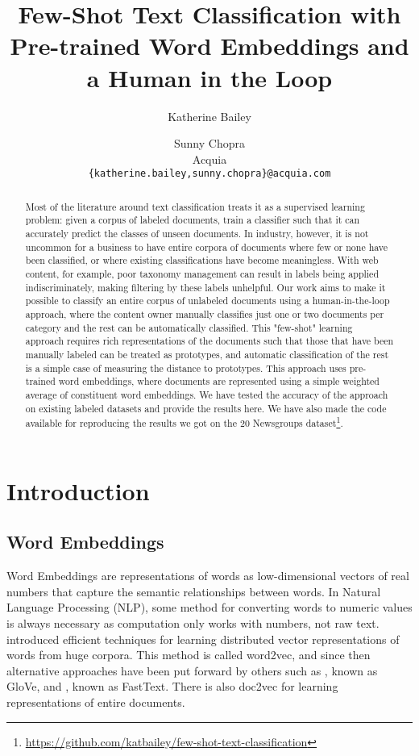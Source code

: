\documentclass{article} %
\title{Few-Shot Text Classification with Pre-trained Word Embeddings and a Human in the Loop}
\author{Katherine Bailey \and Sunny Chopra \\
  Acquia \\
  \texttt{\{katherine.bailey,sunny.chopra\}@acquia.com}
}
\date{}
\begin{document}
\maketitle

\begin{abstract}
Most of the literature around text classification treats it as a supervised learning problem: given a corpus of labeled documents, train a classifier such that it can accurately predict the classes of unseen documents. In industry, however, it is not uncommon for a business to have entire corpora of documents where few or none have been classified, or where existing classifications have become meaningless. With web content, for example, poor taxonomy management can result in labels being applied indiscriminately, making filtering by these labels unhelpful. Our work aims to make it possible to classify an entire corpus of unlabeled documents using a human-in-the-loop approach, where the content owner manually classifies just one or two documents per category and the rest can be automatically classified. This "few-shot" learning approach requires rich representations of the documents such that those that have been manually labeled can be treated as prototypes, and automatic classification of the rest is a simple case of measuring the distance to prototypes. This approach uses pre-trained word embeddings, where documents are represented using a simple weighted average of constituent word embeddings. We have tested the accuracy of the approach on existing labeled datasets and provide the results here. We have also made the code available for reproducing the results we got on the 20 Newsgroups dataset\footnote{\url{https://github.com/katbailey/few-shot-text-classification}}.
\end{abstract}

\section{Introduction}

\subsection*{Word Embeddings}

Word Embeddings are representations of words as low-dimensional vectors of real numbers that capture the semantic relationships between words. In Natural Language Processing (NLP), some method for converting words to numeric values is always necessary as computation only works with numbers, not raw text. \citep{mikolov2013distributed} introduced efficient techniques for learning distributed vector representations of words from huge corpora. This method is called word2vec, and since then alternative approaches have been put forward by others such as \citep{pennington2014glove}, known as GloVe, and \citep{bojanowski2016subword}, known as FastText. There is also doc2vec for learning representations of entire documents.
\end{document}
